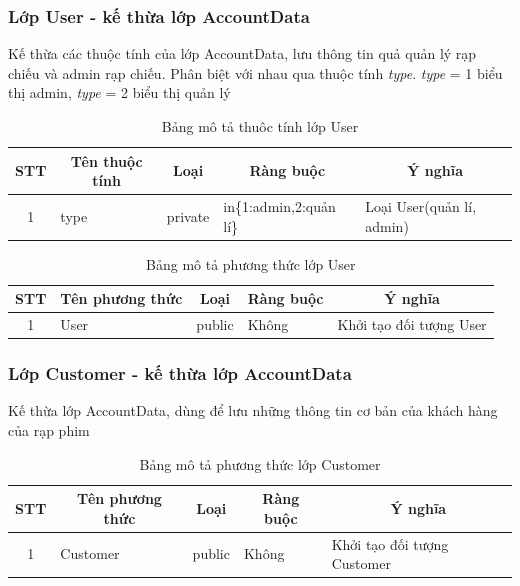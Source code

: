 \documentclass[a4paper, 12pt]{article}
\begin{document}
\subsubsection{Lớp User - kế thừa lớp AccountData}
Kế thừa các thuộc tính của lớp AccountData, lưu thông tin quả quản lý rạp chiếu và admin rạp chiếu. Phân biệt với nhau qua thuộc tính \textit{type}. \textit{type} = 1 biểu thị admin, \textit{type} = 2 biểu thị quản lý
\begin{table}[H]
	\begin{center}
		\begin{tabular}{|c|l|c|l|l|}
			\hline
			STT & \multicolumn{1}{c|}{Tên thuộc tính} & Loại    & \multicolumn{1}{c|}{Ràng buộc} & \multicolumn{1}{c|}{Ý nghĩa} \\ \hline
			1   & type                                & private & in\{1:admin,2:quản lí\}        & Loại User(quản lí, admin)    \\ \hline
			\end{tabular}
			\caption{Bảng mô tả thuôc tính lớp User}
	\end{center}
\end{table}

\begin{table}[H]
	\begin{center}
		\begin{tabular}{|c|l|c|l|l|}
			\hline
			STT & \multicolumn{1}{c|}{Tên phương thức} & Loại   & \multicolumn{1}{c|}{Ràng buộc} & \multicolumn{1}{c|}{Ý nghĩa} \\ \hline
			1   & User                                 & public &            Không                    & Khởi tạo đối tượng User      \\ \hline
			\end{tabular}
		\caption{Bảng mô tả phương thức lớp User}
	\end{center}
\end{table}

\subsubsection{Lớp Customer - kế thừa lớp AccountData}
Kế thừa lớp AccountData, dùng để lưu những thông tin cơ bản của khách hàng của rạp phim
\begin{table}[H]
	\begin{center}
		\begin{tabular}{|c|l|c|l|l|}
			\hline
			STT & \multicolumn{1}{c|}{Tên phương thức} & Loại   & \multicolumn{1}{c|}{Ràng buộc} & \multicolumn{1}{c|}{Ý nghĩa} \\ \hline
			1   & Customer                             & public &         Không                       & Khởi tạo đối tượng Customer  \\ \hline
			\end{tabular}
		\caption{Bảng mô tả phương thức lớp Customer}
	\end{center}
\end{table}
\end{document}
